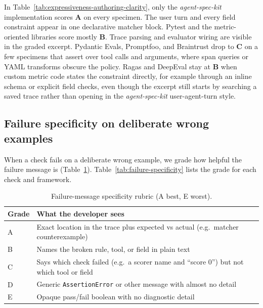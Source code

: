 In Table~\ref{tab:expressiveness-authoring-clarity}, only the \emph{agent-spec-kit} implementation scores \textbf{A} on every specimen. The user turn and every field constraint appear in one declarative matcher block. Pytest and the metric-oriented libraries score mostly \textbf{B}. Trace parsing and evaluator wiring are visible in the graded excerpt. Pydantic Evals, Promptfoo, and Braintrust drop to \textbf{C} on a few specimens that assert over tool calls and arguments, where span queries or YAML transforms obscure the policy. Ragas and DeepEval stay at \textbf{B} when custom metric code states the constraint directly, for example through an inline schema or explicit field checks, even though the excerpt still starts by searching a saved trace rather than opening in the \emph{agent-spec-kit} user-agent-turn style.

\subsection{Failure specificity on deliberate wrong examples}

When a check fails on a deliberate wrong example, we grade how helpful the failure message is (Table~\ref{tab:specificity-rubric}). Table~\ref{tab:failure-specificity} lists the grade for each check and framework.

\begin{table}[htbp]
\centering
\caption{Failure-message specificity rubric (A best, E worst).}
\label{tab:specificity-rubric}
\begin{tabular}{@{}lp{9.2cm}@{}}
\toprule
Grade & What the developer sees \\
\midrule
A & Exact location in the trace plus expected vs actual (e.g.\ matcher counterexample) \\
B & Names the broken rule, tool, or field in plain text \\
C & Says which check failed (e.g.\ a scorer name and ``score 0'') but not which tool or field \\
D & Generic \texttt{AssertionError} or other message with almost no detail \\
E & Opaque pass/fail boolean with no diagnostic detail \\
\bottomrule
\end{tabular}
\end{table}

